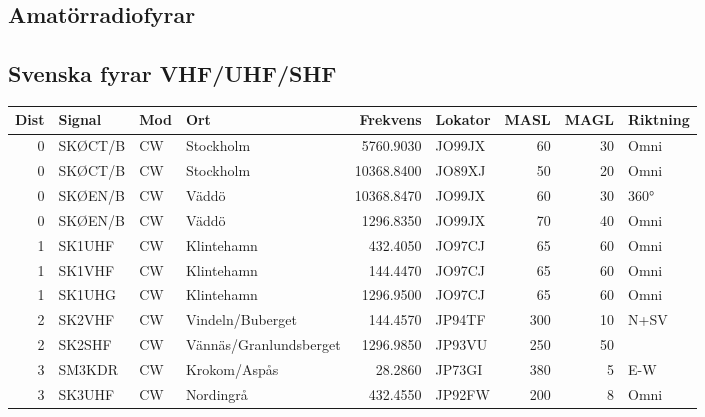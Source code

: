 \clearpage

\begin{landscape}
\section{Amatörradiofyrar}
\subsection{Svenska fyrar VHF/UHF/SHF}
\begin{longtable}{rlllrlrrl}
	          \bf Dist & \bf Signal & \bf Mod & \bf Ort                & \bf Frekvens & \bf Lokator & \bf MASL & \bf MAGL & \bf Riktning \\ \hline
	\endhead
	                 0 & SKØCT/B    & CW      & Stockholm              &    5760.9030 & JO99JX      &       60 &       30 & Omni         \\
	                 0 & SKØCT/B    & CW      & Stockholm              &   10368.8400 & JO89XJ      &       50 &       20 & Omni         \\
	                 0 & SKØEN/B    & CW      & Väddö                  &   10368.8470 & JO99JX      &       60 &       30 & 360°         \\
	                 0 & SKØEN/B    & CW      & Väddö                  &    1296.8350 & JO99JX      &       70 &       40 & Omni         \\
	                 1 & SK1UHF     & CW      & Klintehamn             &     432.4050 & JO97CJ      &       65 &       60 & Omni         \\
	                 1 & SK1VHF     & CW      & Klintehamn             &     144.4470 & JO97CJ      &       65 &       60 & Omni         \\
	                 1 & SK1UHG     & CW      & Klintehamn             &    1296.9500 & JO97CJ      &       65 &       60 & Omni         \\
	                 2 & SK2VHF     & CW      & Vindeln/Buberget       &     144.4570 & JP94TF      &      300 &       10 & N+SV         \\
	                 2 & SK2SHF     & CW      & Vännäs/Granlundsberget &    1296.9850 & JP93VU      &      250 &       50 &              \\
	                 3 & SM3KDR     & CW      & Krokom/Aspås           &      28.2860 & JP73GI      &      380 &        5 & E-W          \\
	                 3 & SK3UHF     & CW      & Nordingrå              &     432.4550 & JP92FW      &      200 &        8 & Omni         \\

\end{longtable}
\end{landscape}
